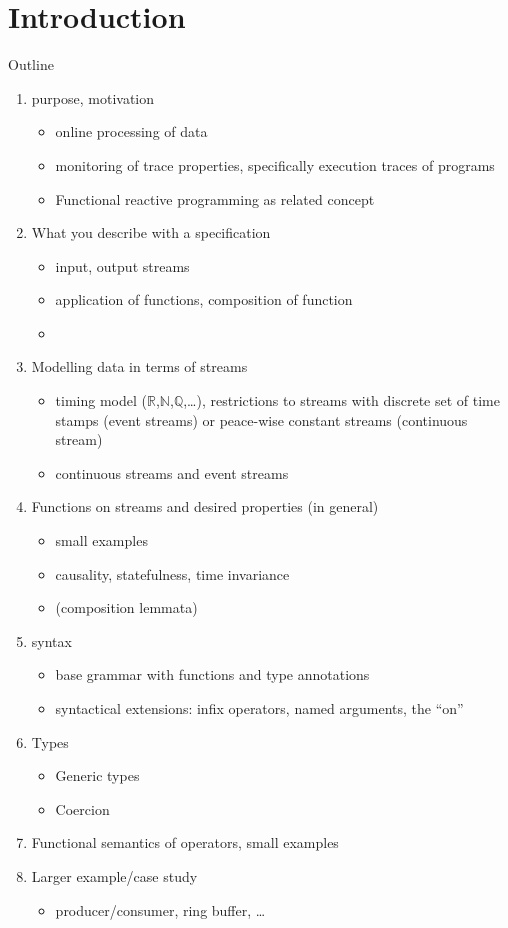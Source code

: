 \section{Introduction}

Outline

\begin{enumerate}
  \item purpose, motivation
  \begin{itemize}
    \item online processing of data
    \item monitoring of trace properties, specifically execution traces of programs
    \item Functional reactive programming as related concept
  \end{itemize}
  \item What you describe with a \tessla specification
  \begin{itemize}    
    \item input, output streams
    \item application of functions, composition of function
    \item 
  \end{itemize}
  \item Modelling data in terms of streams
  \begin{itemize}
    \item timing model ($ℝ$,$ℕ$,$ℚ$,…), restrictions to streams with discrete set of time stamps (event streams) or peace-wise constant streams (continuous stream)
    \item continuous streams and event streams    
   \end{itemize}
   \item Functions on streams and desired properties (in general)
   \begin{itemize}
     \item small examples
     \item causality, statefulness, time invariance 
     \item (composition lemmata)
   \end{itemize}
   \item \tessla syntax
   \begin{itemize}
      \item base grammar with functions and type annotations
      \item syntactical extensions: infix operators, named arguments, the “on”
   \end{itemize}
   \item Types
   \begin{itemize}
     \item Generic types
     \item Coercion 
   \end{itemize}
   \item Functional semantics of operators, small examples
   \item Larger example/case study
   \begin{itemize}
     \item producer/consumer, ring buffer, …
   \end{itemize}
   
   
\end{enumerate}
